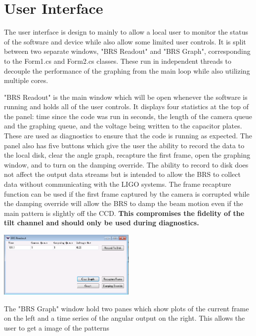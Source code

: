 \documentclass{article}
\begin{document}
\section{User Interface}

The user interface is design to mainly to allow a local user to monitor the status of the software and device while also allow some limited user controls. It is split between two separate windows, "BRS Readout" and "BRS Graph", corresponding to the Form1.cs and Form2.cs classes. These run in independent threads to decouple the performance of the graphing from the main loop while also utilizing multiple cores.

"BRS Readout" is the main window which will be open whenever the software is running and holds all of the user controls. It displays four statistics at the top of the panel: time since the code was run in seconds, the length of the camera queue and the graphing queue, and the voltage being written to the capacitor plates. These are used as diagnostics to ensure that the code is running as expected. The panel also has five buttons which give the user the ability to record the data to the local disk, clear the angle graph, recapture the first frame, open the graphing window, and to turn on the damping override. The ability to record to disk does not affect the output data streams but is intended to allow the BRS to collect data without communicating with the LIGO systems. The frame recapture function can be used if the first frame captured by the camera is corrupted while the damping override will allow the BRS to damp the beam motion even if the main pattern is slightly off the CCD. \textbf{This compromises the fidelity of the tilt channel and should only be used during diagnostics.}

\begin{center}
\includegraphics[width=0.5\textwidth]{BRSReadoutScreen.png}\\
\end{center}

The "BRS Graph" window hold two panes which show plots of the current frame on the left and a time series of the angular output on the right. This allows the user to get a image of the patterns 
\end{document}
